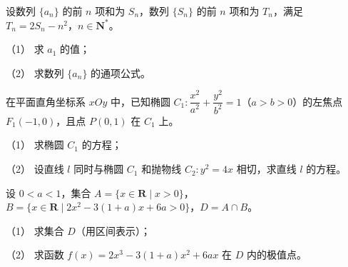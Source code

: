 \begin{question}
设数列 $\{a_n\}$ 的前 $n$ 项和为 $S_n$，数列 $\{S_n\}$ 的前 $n$ 项和为 $T_n$，满足 $T_n=2S_n-n^2$，$n\in\mathbf N^*$。

（1） 求 $a_1$ 的值；

（2） 求数列 $\{a_n\}$ 的通项公式。

\end{question}
\begin{question}
在平面直角坐标系 $xOy$ 中，已知椭圆 $C_1:\dfrac{x^2}{a^2}+\dfrac{y^2}{b^2}=1$（$a>b>0$）的左焦点 $F_1(-1,0)$，且点 $P(0,1)$ 在 $C_1$ 上。

（1） 求椭圆 $C_1$ 的方程；

（2） 设直线 $l$ 同时与椭圆 $C_1$ 和抛物线 $C_2:y^2=4x$ 相切，求直线 $l$ 的方程。

\end{question}
\begin{question}
设 $0<a<1$，集合 $A=\{x\in\mathbf R\mid x>0\}$，$B=\{x\in\mathbf R\mid 2x^2-3(1+a)x+6a>0\}$，$D=A\cap B$。

（1） 求集合 $D$（用区间表示）；

（2） 求函数 $f(x)=2x^3-3(1+a)x^2+6ax$ 在 $D$ 内的极值点。

\end{question}